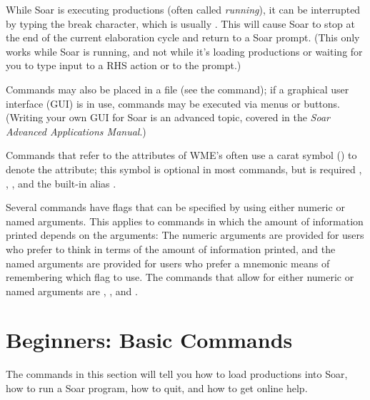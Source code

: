 {While Soar is executing productions (often called \emph{running}), it can be
interrupted by typing the break character, which is usually .
This will cause Soar to stop at the end of the current elaboration cycle and
return to a Soar prompt. (This only works while Soar is running, and not while
it's loading productions or waiting for you to type input to a RHS
 action or to the  prompt.)



Commands may also be placed in a file (see the  command); if a
graphical user interface (GUI) is in use, commands may be executed via menus
or buttons. (Writing your own GUI for Soar is an advanced topic, covered in
the \emph{Soar Advanced Applications Manual}.)

Commands that refer to the attributes of WME's often use a carat symbol
(\soar{\carat}) to denote the attribute; this symbol is optional in most
commands, but is required , , , and
the built-in alias .


Several commands have flags that can be specified by using either numeric or
named arguments. This applies to commands in which the amount of information
printed depends on the arguments: The numeric arguments are provided for users
who prefer to think in terms of the amount of information printed, and the
named arguments are provided for users who prefer a mnemonic means of
remembering which flag to use. The commands that allow for either numeric or
named arguments are , , and .

\section{Beginners: Basic Commands}

The commands in this section will tell you how to load productions into Soar,
how to run a Soar program, how to quit, and how to get online help.

}

